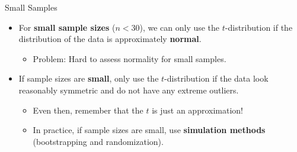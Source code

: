 \documentclass[
  ignorenonframetext,
  aspectratio=32,
]{beamer}
\providecommand{\tightlist}{%
  \setlength{\itemsep}{0pt}\setlength{\parskip}{0pt}}\usepackage{longtable,booktabs,array}
\begin{document}
\begin{frame}{Small Samples}
\protect\hypertarget{small-samples}{}
\begin{itemize}
\item
  For \textbf{small sample sizes} (\(n<30\)), we can only use the
  \(t\)-distribution if the distribution of the data is approximately
  \textbf{normal}.

  \begin{itemize}
  \tightlist
  \item
    Problem: Hard to assess normality for small samples.
  \end{itemize}
\end{itemize}

\pause

\begin{itemize}
\item
  If sample sizes are \textbf{small}, only use the \(t\)-distribution if
  the data look reasonably symmetric and do not have any extreme
  outliers.

  \begin{itemize}
  \item
    Even then, remember that the \(t\) is just an approximation!
  \item
    In practice, if sample sizes are small, use \textbf{simulation
    methods} (bootstrapping and randomization).
  \end{itemize}
\end{itemize}
\end{frame}
\end{document}
